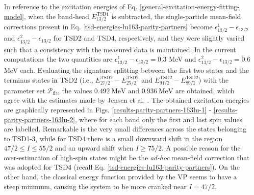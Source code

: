 In reference to the excitation energies of Eq. \ref{general-excitation-energy-fitting-model}, when the band-head $E_{13/2}^\text{TSD1}$ is subtracted, the single-particle mean-field corrections present in Eq. \ref{tsd-energies-lu163-parity-partners} become $\epsilon_{13/2}^1-\epsilon_{13/2}$ and $\epsilon_{13/2}^2-\epsilon_{13/2}$ for TSD2 and TSD4, respectively, and they were slightly varied such that a consistency with the measured data is maintained. In the current computations the two quantities are $\epsilon_{13/2}^1-\epsilon_{13/2}=0.3$ MeV and $\epsilon_{13/2}^2-\epsilon_{13/2}=0.6$ MeV each. Evaluating the signature splitting between the first two states and the terminus states in TSD2 (i.e., $E^\text{TSD2}_{27/2}-E^\text{TSD2}_{25/2}$ and $E^\text{TSD2}_{91/2}-E^\text{TSD2}_{89/2}$) with the parameter set $\mathcal{P}_\text{fit}$, the values $0.492\ \text{MeV}$ and $0.936\ \text{MeV}$ are obtained, which agree with the estimates made by Jensen et al. \cite{jensen2002wobbling}. The obtained excitation energies are graphically represented in Figs. \ref{results-parity-partners-163lu-1} - \ref{results-parity-partners-163lu-2}, where for each band only the first and last spin values are labelled. Remarkable is the very small differences across the states belonging to TSD1-3, while for TSD4 there is a small downward shift in the region $47/2\leq I\leq 55/2$ and an upward shift when $I\geq 75/2$. A possible reason for the over-estimation of high-spin states might be the \emph{ad-hoc} mean-field correction that was adopted for TSD4 (recall Eq. \ref{tsd-energies-lu163-parity-partners}). On the other hand, the classical energy function provided by the VP seems to have a steep minimum, causing the system to be more cranked near $I=47/2$.
